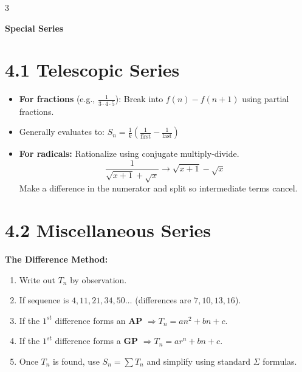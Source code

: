 \documentclass[11pt,a4paper,landscape]{article}
\begin{document}
\newpage
\begin{multicols*}{3}

\textbf{\Huge Special Series}

\section*{4.1 Telescopic Series}
\begin{itemize}
\item \textbf{For fractions} (e.g., $\frac{1}{3 \cdot 4 \cdot 5}$): Break into $f(n) - f(n+1)$ using partial fractions.
\item Generally evaluates to: $S_n = \frac{1}{k} \left( \frac{1}{\text{first}} - \frac{1}{\text{last}} \right)$
\item \textbf{For radicals:} Rationalize using conjugate multiply-divide.
  $$ \frac{1}{\sqrt{x+1} + \sqrt{x}} \rightarrow \sqrt{x+1} - \sqrt{x} $$
  Make a difference in the numerator and split so intermediate terms cancel.
\end{itemize}

\section*{4.2 Miscellaneous Series}
\textbf{The Difference Method:}
\begin{enumerate}
\item Write out $T_n$ by observation.
\item If sequence is $4, 11, 21, 34, 50 \dots$ (differences are $7, 10, 13, 16$).
\item If the $1^{st}$ difference forms an \textbf{AP} $\Rightarrow T_n = an^2+bn+c$.
\item If the $1^{st}$ difference forms a \textbf{GP} $\Rightarrow T_n = ar^n+bn+c$.
\item Once $T_n$ is found, use $S_n = \sum T_n$ and simplify using standard $\Sigma$ formulas.
\end{enumerate}


\end{multicols*}
\end{document}
